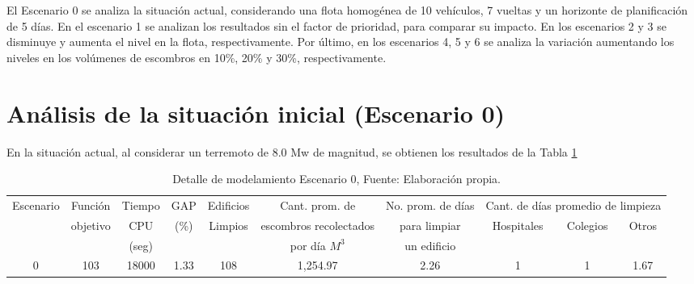 \documentclass[letterpaper,conference]{IEEEtran}
\begin{document}
El Escenario 0 se analiza la situación actual, considerando una flota homogénea de 10 vehículos, 7 vueltas y un horizonte de planificación de 5 días. En el escenario 1 se analizan los resultados sin el factor de prioridad, para comparar su impacto. En los escenarios 2 y 3 se disminuye y aumenta el nivel en la flota, respectivamente. Por último, en los escenarios 4, 5 y 6 se analiza la variación aumentando los niveles en los volúmenes de escombros en 10\%, 20\% y 30\%, respectivamente.


\section{Análisis de la situación inicial (Escenario 0)}

En la situación actual, al considerar un terremoto de 8.0 Mw de magnitud, se obtienen los resultados de la Tabla \ref{tab:tab2}

\begin{table}[h!]
\resizebox{18cm}{!} {
\begin{tabular}{c|c|c|c|c|c|c|c|c|c}
\hline
\multirow{3}{*}{Escenario} & Función                   & Tiempo & GAP                   & Edificios                & Cant. prom. de                 & No. prom. de días & \multicolumn{3}{c|}{Cant. de días promedio de limpieza}                          \\ \cline{8-10} 
                           & \multirow{2}{*}{objetivo} & CPU    & \multirow{2}{*}{(\%)} & \multirow{2}{*}{Limpios} & escombros recolectados         & para limpiar      & \multirow{2}{*}{Hospitales} & \multirow{2}{*}{Colegios} & \multirow{2}{*}{Otros} \\
                           &                           & (seg)  &                       &                          & por día $M^{3}$ & un edificio       &                             &                           &                        \\ \hline
0                          & 103                       & 18000  & 1.33                  & 108                      & 1,254.97                         & 2.26              & 1                           & 1                         & 1.67                   \\ \hline
\end{tabular}
}
\caption{Detalle de modelamiento Escenario 0, Fuente: Elaboración propia.}
\label{tab:tab2}
\end{table}

\end{document}
